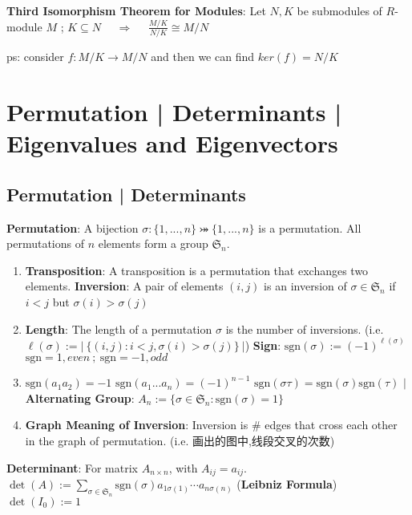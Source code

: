 \documentclass[9pt]{article}
\begin{document}
\vspace{2pt}
\np\textbf{Third Isomorphism Theorem for Modules}: Let $N,K$ be submodules of $R$-module $M$ ; $K\subseteq N$ \ \ $\Rightarrow$ \ \ $\frac{M/K}{N/K}\cong M/N$

\quad ps: {\footnotesize consider $f:M/K\to M/N$ and then we can find $ker(f)=N/K$}


\section{Permutation | Determinants | Eigenvalues and Eigenvectors} %

\subsection{Permutation | Determinants} %

\textbf{Permutation}: A bijection $\sigma:\{1,...,n\}\bij\{1,...,n\}$ is a permutation. \qquad \qquad All permutations of $n$ elements form a group $\mathfrak{S}_n$.

\begin{enumerate}[itemsep=-2pt, topsep=-2pt]
    \item {\scriptsize \textbf{Transposition}: A transposition is a permutation that exchanges two elements. \qquad \textbf{Inversion}: A pair of elements $(i,j)$ is an inversion of $\sigma\in\mathfrak{S}_n$ if $i<j$ but $\sigma(i)>\sigma(j)$}
    \item {\scriptsize \textbf{Length}: The length of a permutation $\sigma$ is the number of inversions. (i.e. $\ell(\sigma):=\left|\ \{(i,j):i<j,\sigma(i)>\sigma(j)\}\ \right|$) \qquad \textbf{Sign}: $\text{sgn}(\sigma):=(-1)^{\ell(\sigma)}$ \qquad $\text{sgn}=1,even \ ; \ \text{sgn}=-1,odd$}
    \item $\text{sgn}(a_1a_2)=-1$ \quad $\text{sgn}(a_1...a_n)=(-1)^{n-1}$ \quad $\text{sgn}(\sigma\tau)=\text{sgn}(\sigma)\text{sgn}(\tau)$ \quad $\big|$ \quad \textbf{Alternating Group}: $A_n:=\{\sigma\in\mathfrak{S}_n:\text{sgn}(\sigma)=1\}$
    \item \textbf{Graph Meaning of Inversion}: {\small Inversion is \# edges that cross each other in the graph of permutation. {\footnotesize (i.e. 画出的图中,线段交叉的次数)}}
\end{enumerate}

\textbf{Determinant}: For matrix $A_{n\times n}$, with $A_{ij}=a_{ij}$. \quad $\det(A):=\sum_{\sigma\in\mathfrak{S}_n}\text{sgn}(\sigma)a_{1\sigma(1)}\cdots a_{n\sigma(n)}$ (\textbf{Leibniz Formula}) \qquad $\det(I_0):=1$
\end{document}
